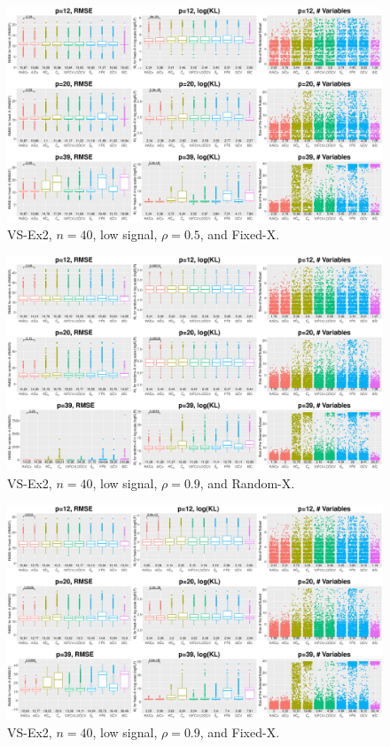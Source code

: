 \begin{figure}[!ht]
\centering
\includegraphics[width=\textwidth]{figures/supplement/fixedx_VS-Ex2_n40_lsnr_rho05.eps}
\caption{VS-Ex2, $n=40$, low signal, $\rho=0.5$, and Fixed-X.}
\end{figure}
\clearpage
\begin{figure}[!ht]
\centering
\includegraphics[width=\textwidth]{figures/supplement/randomx_VS-Ex2_n40_lsnr_rho09.eps}
\caption{VS-Ex2, $n=40$, low signal, $\rho=0.9$, and Random-X.}
\end{figure}
\begin{figure}[!ht]
\centering
\includegraphics[width=\textwidth]{figures/supplement/fixedx_VS-Ex2_n40_lsnr_rho09.eps}
\caption{VS-Ex2, $n=40$, low signal, $\rho=0.9$, and Fixed-X.}
\end{figure}
